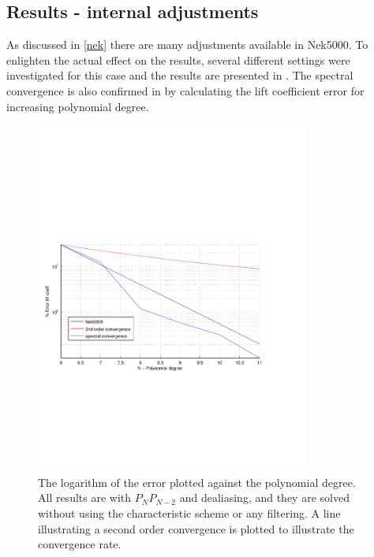 \subsection{Results - internal adjustments }
As discussed in \cref{nek} there are many adjustments available in Nek5000. 
To enlighten the actual effect on the results, several different settings were 
investigated for this case and the results are presented in . 
The spectral convergence is also confirmed in  by calculating the 
lift coefficient error for increasing polynomial degree. 
%
\begin{figure}[h]
	\centerline{
        \includegraphics[trim=0.5cm 7cm 0.5cm 7cm, width=0.8\textwidth]{Figures/lift_coef4.pdf}}
	\caption{The logarithm of the error plotted against the polynomial degree. All results 
        are with $P_NP_{N-2}$ and dealiasing, and they are solved without using the 
    characteristic scheme or any filtering. A line illustrating a second order convergence is 
    plotted to illustrate the convergence rate.}
	\label{fig:liftconv}
\end{figure}
%

